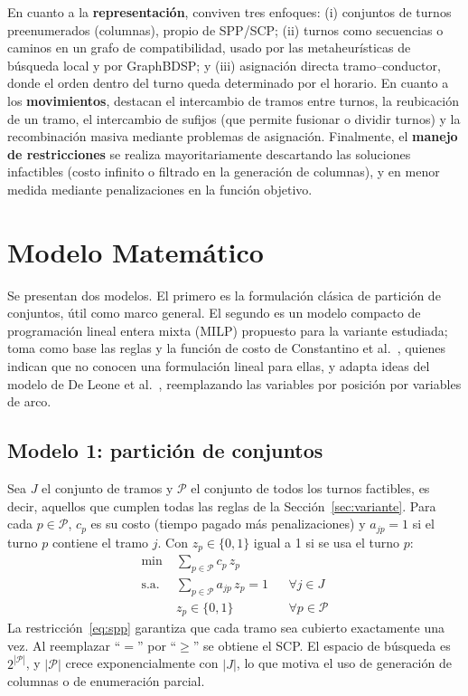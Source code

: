 \documentclass[letter, 10pt]{article}
\begin{document}
En cuanto a la \textbf{representación}, conviven tres enfoques: (i) conjuntos de turnos preenumerados (columnas), propio de SPP/SCP; (ii) turnos como secuencias o caminos en un grafo de compatibilidad, usado por las metaheurísticas de búsqueda local y por GraphBDSP; y (iii) asignación directa tramo--conductor, donde el orden dentro del turno queda determinado por el horario. En cuanto a los \textbf{movimientos}, destacan el intercambio de tramos entre turnos, la reubicación de un tramo, el intercambio de sufijos (que permite fusionar o dividir turnos) y la recombinación masiva mediante problemas de asignación. Finalmente, el \textbf{manejo de restricciones} se realiza mayoritariamente descartando las soluciones infactibles (costo infinito o filtrado en la generación de columnas), y en menor medida mediante penalizaciones en la función objetivo.

\section{Modelo Matem\'atico}\label{sec:modelo}
Se presentan dos modelos. El primero es la formulación clásica de partición de conjuntos, útil como marco general. El segundo es un modelo compacto de programación lineal entera mixta (MILP) propuesto para la variante estudiada; toma como base las reglas y la función de costo de Constantino et al.~\cite{Constantino2017}, quienes indican que no conocen una formulación lineal para ellas, y adapta ideas del modelo de De Leone et al.~\cite{DeLeone2011a}, reemplazando las variables por posición por variables de arco.

\subsection{Modelo 1: partición de conjuntos}
Sea $J$ el conjunto de tramos y $\mathcal{P}$ el conjunto de todos los turnos factibles, es decir, aquellos que cumplen todas las reglas de la Sección~\ref{sec:variante}. Para cada $p\in\mathcal{P}$, $c_p$ es su costo (tiempo pagado más penalizaciones) y $a_{jp}=1$ si el turno $p$ contiene el tramo $j$. Con $z_p\in\{0,1\}$ igual a 1 si se usa el turno $p$:
\begin{align}
\min \; & \sum_{p\in\mathcal{P}} c_p\, z_p \\
\text{s.a.}\; & \sum_{p\in\mathcal{P}} a_{jp}\, z_p = 1 && \forall j\in J \label{eq:spp}\\
& z_p\in\{0,1\} && \forall p\in\mathcal{P}
\end{align}
La restricción~\eqref{eq:spp} garantiza que cada tramo sea cubierto exactamente una vez. Al reemplazar ``$=$'' por ``$\geq$'' se obtiene el SCP. El espacio de búsqueda es $2^{|\mathcal{P}|}$, y $|\mathcal{P}|$ crece exponencialmente con $|J|$, lo que motiva el uso de generación de columnas o de enumeración parcial.
\end{document}
